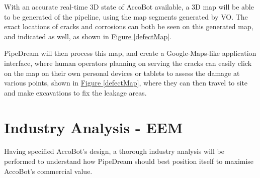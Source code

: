 \documentclass[11pt]{article}		%
\newcommand{\figref}[1]{\hyperref[#1]{Figure \ref*{#1}}}    %
\begin{document}
	With an accurate real-time 3D state of AccoBot available, a 3D map will be able to be generated of the pipeline, using the map segments generated by VO. The exact locations of cracks and corrosions can both be seen on this generated map, and indicated as well, as shown in \figref{defectMap}.
    
    \begin{floatingfigure}[r]{0pt} \end{floatingfigure}
		    
	PipeDream will then process this map, and create a Google-Maps-like application interface, where human operators planning on serving the cracks can easily click on the map on their own personal devices or tablets to assess the damage at various points, shown in \figref{defectMap}, where they can then travel to site and make excavations to fix the leakage areas. 

	\section{Industry Analysis - EEM}
		
	Having specified AccoBot's design, a thorough industry analysis will be performed to understand how PipeDream should best position itself to maximise AccoBot's commercial value. 
		
\end{document}
